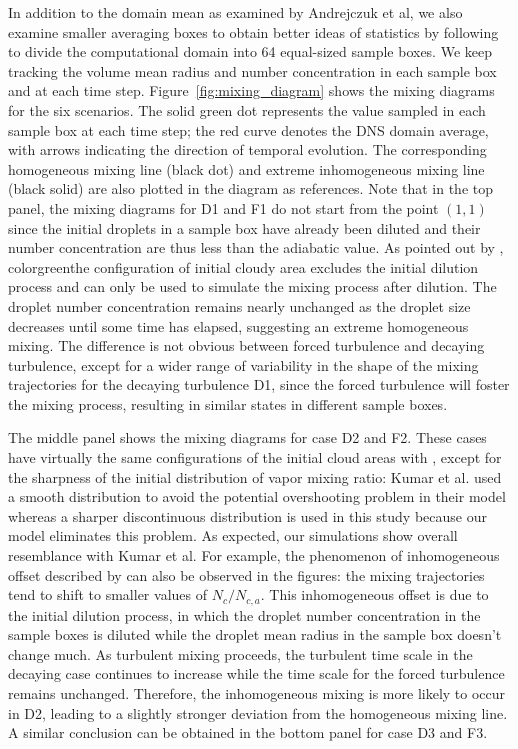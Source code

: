 \documentclass[draft,linenumbers]{agujournal}
\newcommand{\Fig}[1]{Figure~\ref{#1}}
\begin{document}
In addition to the domain mean as examined by Andrejczuk et al, we also examine smaller averaging boxes to obtain better ideas of statistics by following \citet{Kumar14} to divide the computational domain into 64 equal-sized sample boxes. We keep tracking the volume mean radius and number concentration in each sample box and at each time step. \Fig{fig:mixing_diagram} shows the mixing diagrams for the six scenarios. The solid green dot represents the value sampled in each sample box at each time step; the red curve denotes the DNS domain average, with arrows indicating the direction of temporal evolution. The corresponding homogeneous mixing line (black dot) and extreme inhomogeneous mixing line (black solid) are also plotted in the diagram as references. Note that in the top panel, the mixing diagrams for D1 and F1 do not start from the point $(1,1)$ since the initial droplets in a sample box have already been diluted and their number concentration are thus less than the adiabatic value. As pointed out by \citet{And04}, {color{green}the configuration of initial cloudy area} excludes the initial dilution process and can only be used to simulate the mixing process after dilution. The droplet number concentration remains nearly unchanged as the droplet size decreases until some time has elapsed, suggesting an extreme homogeneous mixing. The difference is not obvious between forced turbulence and decaying turbulence, except for a wider range of variability in the shape of the mixing trajectories for the decaying turbulence D1, since the forced turbulence will foster the mixing process, resulting in similar states in different sample boxes. 

The middle panel shows the mixing diagrams for case D2 and F2. These cases have virtually the same configurations {of the initial cloud areas} with \citet{Kumar14}, except { for the sharpness of the initial distribution of vapor mixing ratio: Kumar et al. used a smooth distribution to avoid the potential overshooting problem in their model whereas a sharper discontinuous distribution is used in this study because our model eliminates this problem. As expected, our simulations show overall resemblance with Kumar et al. For example,} the phenomenon of inhomogeneous offset described by \citet{Kumar14} can also be observed in the figures: the mixing trajectories tend to shift to smaller values of $N_c/N_{c,a}$. This inhomogeneous offset is due to the initial dilution process, in which the droplet number concentration in the sample boxes is diluted while the droplet mean radius in the sample box doesn't change much. As turbulent mixing proceeds, the turbulent time scale in the decaying case continues to increase while the time scale for the forced turbulence remains unchanged. Therefore, the inhomogeneous mixing is more likely to occur in D2, leading to a slightly stronger deviation from the homogeneous mixing line.  A similar conclusion can be obtained in the bottom panel for case D3 and F3. 
\end{document}
